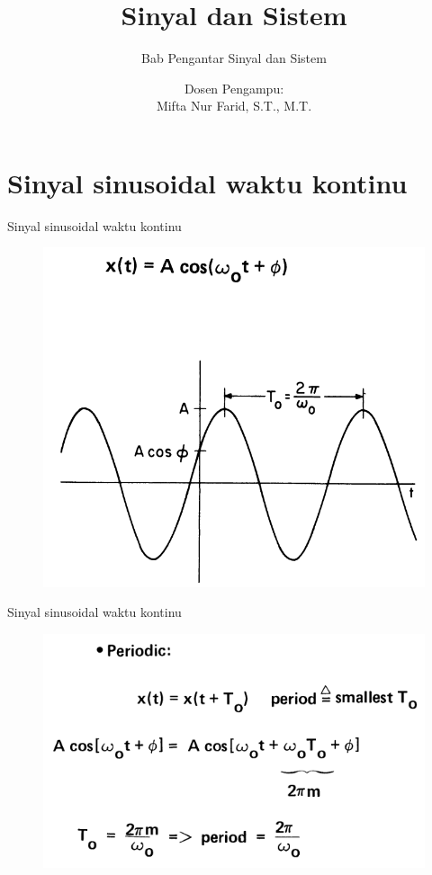 \documentclass[pdflatex,compress,mathserif]{beamer}
\title{Sinyal dan Sistem}
\subtitle{Bab Pengantar Sinyal dan Sistem}
\author{Dosen Pengampu:\\Mifta Nur Farid, S.T., M.T.}
\begin{document}
\maketitle

\section{Sinyal sinusoidal waktu kontinu}
\begin{frame}{Sinyal sinusoidal waktu kontinu}
	\begin{figure}
		\centering
		\includegraphics[height=0.8\textheight]{img/01.slide_01}
	\end{figure}
\end{frame}

\begin{frame}{Sinyal sinusoidal waktu kontinu}
	\begin{figure}
		\centering
		\includegraphics[height=0.7\textheight]{img/01.slide_02_01}
	\end{figure}
\end{frame}
\end{document}
